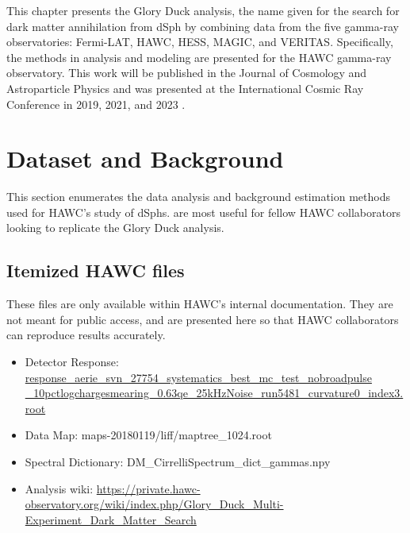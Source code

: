 This chapter presents the Glory Duck analysis, the name given for the search for dark matter annihilation from dSph by combining data from the five gamma-ray observatories: Fermi-LAT, HAWC, HESS, MAGIC, and VERITAS.
Specifically, the methods in analysis and modeling are presented for the HAWC gamma-ray observatory.
This work will be published in the Journal of Cosmology and Astroparticle Physics and was presented at the International Cosmic Ray Conference in 2019, 2021, and 2023 \cite{glory_duck:ICRC2019,glory_duck:ICRC2021,glory_duck:ICRC2023}.

\section{Dataset and Background}\label{sec:gd_databgd}

This section enumerates the data analysis and background estimation methods used for HAWC's study of dSphs.
 are most useful for fellow HAWC collaborators looking to replicate the Glory Duck analysis.

\subsection{Itemized HAWC files}\label{sec:gd_data}
These files are only available within HAWC's internal documentation.
They are not meant for public access, and are presented here so that HAWC collaborators can reproduce results accurately.

\begin{itemize}
    \item Detector Response: \url{response\_aerie\_svn\_27754\_systematics\_best\_mc\_test\_nobroadpulse
    _10pctlogchargesmearing\_0.63qe\_25kHzNoise\_run5481\_curvature0\_index3.root}
    \item Data Map: maps-20180119/liff/maptree\_1024.root
    \item Spectral Dictionary: DM\_CirrelliSpectrum\_dict\_gammas.npy
    \item Analysis wiki: \url{https://private.hawc-observatory.org/wiki/index.php/Glory_Duck_Multi-Experiment_Dark_Matter_Search}
\end{itemize}

